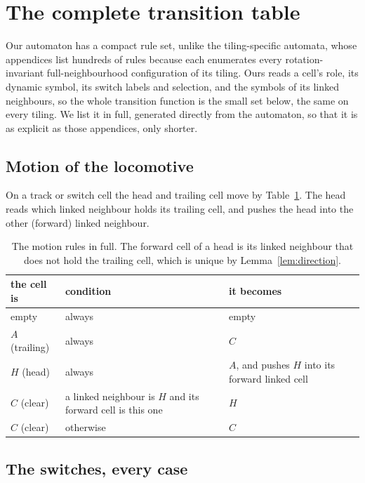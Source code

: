 \section{The complete transition table}
\label{app:rules}

Our automaton has a compact rule set, unlike the tiling-specific automata, whose appendices list hundreds of
rules because each enumerates every rotation-invariant full-neighbourhood configuration of its tiling. Ours
reads a cell's role, its dynamic symbol, its switch labels and selection, and the symbols of its linked
neighbours, so the whole transition function is the small set below, the same on every tiling. We list it in
full, generated directly from the automaton, so that it is as explicit as those appendices, only shorter.

\subsection{Motion of the locomotive}

On a track or switch cell the head and trailing cell move by Table~\ref{tab:enum-motion}. The head reads which
linked neighbour holds its trailing cell, and pushes the head into the other (forward) linked neighbour.

\begin{table}[ht]
\centering
\begin{tabular}{@{}lll@{}}
\toprule
the cell is & condition & it becomes \\
\midrule
empty & always & empty \\
$A$ (trailing) & always & $C$ \\
$H$ (head) & always & $A$, and pushes $H$ into its forward linked cell \\
$C$ (clear) & a linked neighbour is $H$ and its forward cell is this one & $H$ \\
$C$ (clear) & otherwise & $C$ \\
\bottomrule
\end{tabular}
\caption{The motion rules in full. The forward cell of a head is its linked neighbour that does not hold the
trailing cell, which is unique by Lemma~\ref{lem:direction}.}
\label{tab:enum-motion}
\end{table}

\subsection{The switches, every case}

